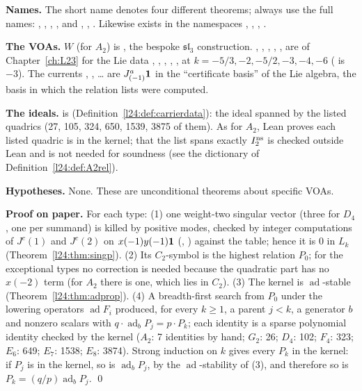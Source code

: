 \begin{dictionary}
\textbf{Names.} The short name  denotes four different theorems; always use the full
names: , ,
, \allowbreak{}, and
, ,
. Likewise  exists in the namespaces
, , , .

\textbf{The VOAs.} $W$ (for $A_2$) is , the bespoke $\mathfrak{sl}_3$
construction. , , , , ,  are
 of Chapter~\ref{ch:L23} for the Lie data , ,
, , ,  at $k=-5/3,-2,-5/2,-3,-4,-6$
( is $-3$). The currents , , … are $J^a_{(-1)}\mathbf 1$ in the
``certificate basis'' of the Lie algebra, the basis in which the relation lists were computed.

\textbf{The ideals.}  is  (Definition~\ref{l24:def:carrierdata}): the ideal
spanned by the listed quadrics (27, 105, 324, 650, 1539, 3875 of them). As for $A_2$, Lean proves each listed
quadric is in the kernel; that the list spans exactly $I_2^{\mathrm{ns}}$ is checked outside Lean and is not needed for
soundness (see the dictionary of Definition~\ref{l24:def:A2rel}).

\textbf{Hypotheses.} None. These are unconditional theorems about specific VOAs.
\end{dictionary}

\textbf{Proof on paper.} For each type: (1) one weight-two singular vector (three for $D_4$, one per
summand) is killed by positive modes, checked by integer computations of $J^c(1)$ and $J^c(2)$ on
$x(-1)y(-1)\mathbf 1$ (, ) against the table; hence it is $0$ in
$L_k$ (Theorem~\ref{l24:thm:singp}). (2) Its $C_2$-symbol is the highest relation $P_0$; for the exceptional
types no correction is needed because the quadratic part has no $x(-2)$ term (for $A_2$ there is one, which
lies in $C_2$). (3) The kernel is $\operatorname{ad}$-stable (Theorem~\ref{l24:thm:adprop}). (4) A
breadth-first search from $P_0$ under the lowering operators $\operatorname{ad}F_i$ produced, for every
$k\ge1$, a parent $j<k$, a generator $b$ and nonzero scalars with $q\cdot\operatorname{ad}_bP_j=p\cdot P_k$;
each identity is a sparse polynomial identity checked by the kernel ($A_2$: 7 identities by hand;
$G_2$: 26; $D_4$: 102; $F_4$: 323; $E_6$: 649; $E_7$: 1538; $E_8$: 3874). Strong induction on $k$ gives every
$P_k$ in the kernel: if $P_j$ is in the kernel, so is $\operatorname{ad}_bP_j$, by the $\operatorname{ad}$-stability of (3), and
therefore so is $P_k=(q/p)\operatorname{ad}_bP_j$. \qed

